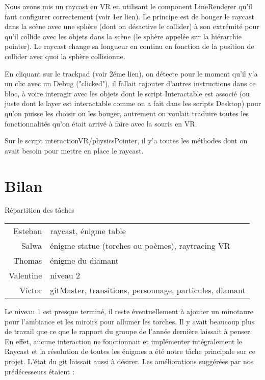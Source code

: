 \documentclass[12pt]{article}
\begin{document}
Nous avons mis un raycast en VR en utilisant le component LineRenderer qu’il faut configurer correctement (voir 1er lien). Le principe est de bouger le raycast dans la scène avec une sphère (dont on désactive le collider) à son extrémité pour qu’il collide avec les objets dans la scène (le sphère appelée sur la hiérarchie pointer). Le raycast change sa longueur en continu en fonction de la position de collider avec quoi la sphère collisionne.

En cliquant sur le trackpad (voir 2éme lien), on détecte pour le moment qu’il y’a un clic avec un Debug ("clicked"), il fallait rajouter d’autres instructions dans ce bloc, à voire interagir avec les objets dont le script Interactable est associé (ou juste dont le layer est interactable comme on a fait dans les scripts Desktop) pour qu’on puisse les choisir ou les bouger, autrement on voulait traduire toutes les fonctionnalités qu’on était arrivé à faire avec la souris en VR.

Sur le script interactionVR/physicsPointer, il y’a toutes les méthodes dont on avait besoin pour mettre en place le raycast.

\section{Bilan}

Répartition des tâches
\begin{center}
    \begin{tabular}{r|l}
        Esteban   & raycast, énigme table                            \\
        Salwa     & énigme statue (torches ou poèmes), raytracing VR \\
        Thomas    & énigme du diamant                                \\
        Valentine & niveau 2                                         \\
        Victor    & gitMaster, transitions, personnage, particules, diamant
    \end{tabular}
\end{center}

Le niveau 1 est presque terminé, il reste éventuellement à ajouter un minotaure pour l’ambiance et les miroirs pour allumer les torches. Il y avait beaucoup plus de travail que ce que le rapport du groupe de l’année dernière laissait à penser. En effet, aucune interaction ne fonctionnait et implémenter intégralement le Raycast et la résolution de toutes les énigmes a été notre tâche principale sur ce projet. L'état du git laissait aussi à désirer. Les améliorations suggérées par nos prédécesseurs étaient :
\end{document}
